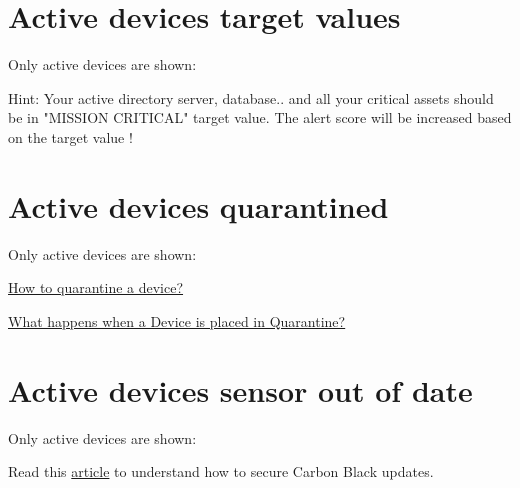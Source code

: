 

\section{Active devices target values}

Only \gls{active} devices are shown:



\begin{tipblock}
Hint: Your active directory server, database.. and all your critical assets should be in "MISSION CRITICAL" target value. The alert score will be increased based on the target value !
\end{tipblock}


\section{Active devices quarantined}

Only \gls{active} devices are shown:



\begin{tipblock}
 \href{https://community.carbonblack.com/t5/Knowledge-Base/Carbon-Black-Cloud-How-to-Quarantine-a-Device-from-the-Carbon/ta-p/71739}{How to quarantine a device?}
\end{tipblock}

\begin{tipblock}
	\href{https://community.carbonblack.com/t5/Knowledge-Base/Endpoint-Standard-What-happens-when-a-Device-is-placed-in/ta-p/71741}{What happens when a Device is placed in Quarantine?}
\end{tipblock}


\section{Active devices sensor out of date}

Only \gls{active} devices are shown:



Read this \href{https://carbonblack.vmware.com/resource/secure-carbon-black-cloud-updates}{article} to understand how to secure Carbon Black updates.\\